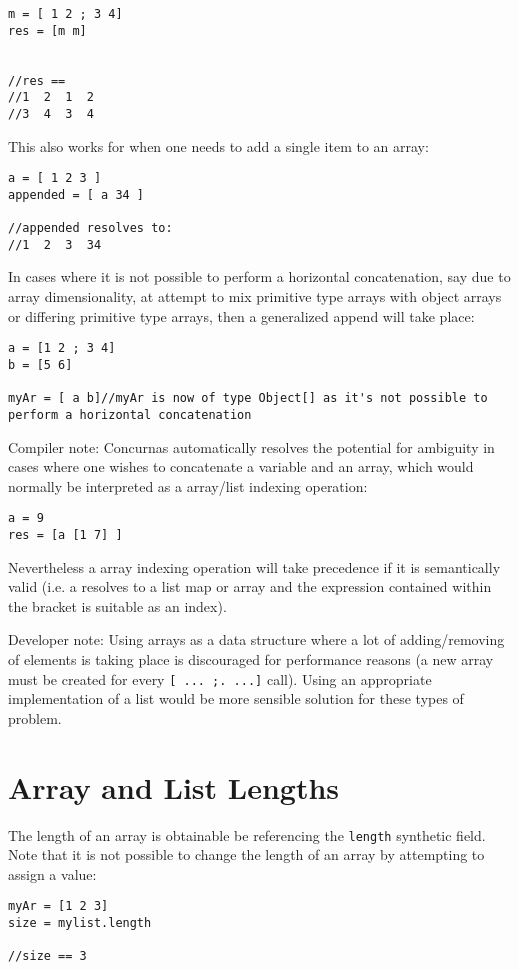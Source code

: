 \documentclass[conc-doc]{subfiles}
\begin{document}
\begin{lstlisting}
m = [ 1 2 ; 3 4]
res = [m m]


//res ==
//1	 2  1  2
//3	 4  3  4
\end{lstlisting}

This also works for when one needs to add a single item to an array:
\begin{lstlisting}
a = [ 1 2 3 ]
appended = [ a 34 ]

//appended resolves to:
//1  2  3  34
\end{lstlisting}

In cases where it is not possible to perform a horizontal concatenation, say due to array dimensionality, at attempt to mix primitive type arrays with object arrays or differing primitive type arrays, then a generalized append will take place:
\begin{lstlisting}
a = [1 2 ; 3 4]
b = [5 6]

myAr = [ a b]//myAr is now of type Object[] as it's not possible to perform a horizontal concatenation
\end{lstlisting}

Compiler note: Concurnas automatically resolves the potential for ambiguity in cases where one wishes to concatenate a variable and an array, which would normally be interpreted as a array/list indexing operation:
\begin{lstlisting}
a = 9
res = [a [1 7] ]
\end{lstlisting}
Nevertheless a array indexing operation will take precedence if it is semantically valid (i.e. a resolves to a list map or array and the expression contained within the bracket is suitable as an index).

Developer note: Using arrays as a data structure where a lot of adding/removing of elements is taking place is discouraged for performance reasons (a new array must be created for every \lstinline{[ ... ;. ...]} call). Using an appropriate implementation of a list would be more sensible solution for these types of problem.

\section{Array and List Lengths}
The length of an array is obtainable be referencing the \lstinline{length} synthetic field. Note that it is not possible to change the length of an array by attempting to assign a value:
\begin{lstlisting}
myAr = [1 2 3]
size = mylist.length

//size == 3
\end{lstlisting}
\end{document}
